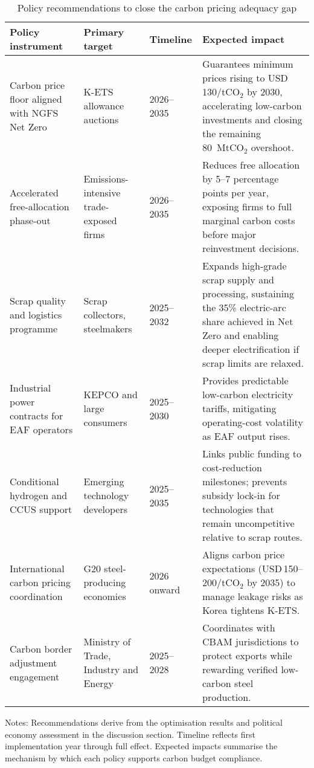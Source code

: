 \begin{table}[ht]
  \centering
  \caption{Policy recommendations to close the carbon pricing adequacy gap}
  \label{tab:policy-matrix}
  \begin{threeparttable}
  \begin{tabular}{@{}p{3.2cm}p{3.2cm}p{2.2cm}p{5.2cm}@{}}
    \toprule
    Policy instrument & Primary target & Timeline & Expected impact \\
    \midrule
    Carbon price floor aligned with NGFS Net Zero & K-ETS allowance auctions & 2026--2035 & Guarantees minimum prices rising to USD\,130/tCO$_2$ by 2030, accelerating low-carbon investments and closing the remaining 80~MtCO$_2$ overshoot. \\
    Accelerated free-allocation phase-out & Emissions-intensive trade-exposed firms & 2026--2035 & Reduces free allocation by 5--7 percentage points per year, exposing firms to full marginal carbon costs before major reinvestment decisions. \\
    Scrap quality and logistics programme & Scrap collectors, steelmakers & 2025--2032 & Expands high-grade scrap supply and processing, sustaining the 35\% electric-arc share achieved in Net Zero and enabling deeper electrification if scrap limits are relaxed. \\
    Industrial power contracts for EAF operators & KEPCO and large consumers & 2025--2030 & Provides predictable low-carbon electricity tariffs, mitigating operating-cost volatility as EAF output rises. \\
    Conditional hydrogen and CCUS support & Emerging technology developers & 2025--2035 & Links public funding to cost-reduction milestones; prevents subsidy lock-in for technologies that remain uncompetitive relative to scrap routes. \\
    International carbon pricing coordination & G20 steel-producing economies & 2026 onward & Aligns carbon price expectations (USD\,150--200/tCO$_2$ by 2035) to manage leakage risks as Korea tightens K-ETS. \\
    Carbon border adjustment engagement & Ministry of Trade, Industry and Energy & 2025--2028 & Coordinates with CBAM jurisdictions to protect exports while rewarding verified low-carbon steel production. \\
    \bottomrule
  \end{tabular}
  \begin{tablenotes}
    \footnotesize
    \item Notes: Recommendations derive from the optimisation results and political economy assessment in the discussion section. Timeline reflects first implementation year through full effect. Expected impacts summarise the mechanism by which each policy supports carbon budget compliance.
  \end{tablenotes}
  \end{threeparttable}
\end{table}
